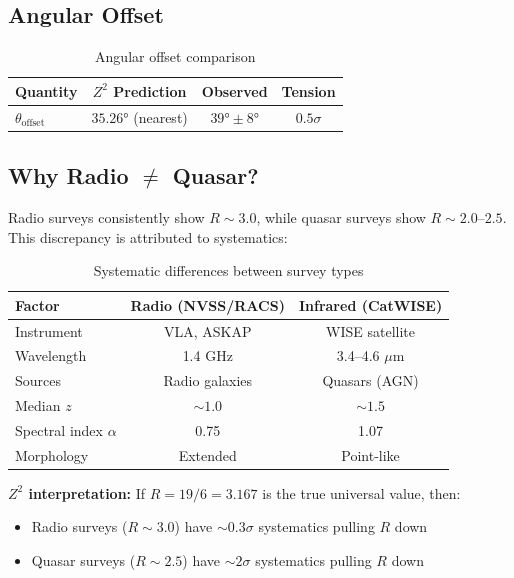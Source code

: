 \documentclass[12pt,a4paper]{article}
\begin{document}
\subsection{Angular Offset}

\begin{table}[H]
\centering
\caption{Angular offset comparison}
\begin{tabular}{lccc}
\toprule
Quantity & $Z^2$ Prediction & Observed & Tension \\
\midrule
$\theta_{\text{offset}}$ & $35.26°$ (nearest) & $39° \pm 8°$ & $0.5\sigma$ \\
\bottomrule
\end{tabular}
\end{table}

\subsection{Why Radio $\neq$ Quasar?}

Radio surveys consistently show $R \sim 3.0$, while quasar surveys show $R \sim 2.0$--$2.5$. This discrepancy is attributed to systematics:

\begin{table}[H]
\centering
\caption{Systematic differences between survey types}
\begin{tabular}{lcc}
\toprule
Factor & Radio (NVSS/RACS) & Infrared (CatWISE) \\
\midrule
Instrument & VLA, ASKAP & WISE satellite \\
Wavelength & 1.4 GHz & 3.4--4.6 $\mu$m \\
Sources & Radio galaxies & Quasars (AGN) \\
Median $z$ & $\sim 1.0$ & $\sim 1.5$ \\
Spectral index $\alpha$ & 0.75 & 1.07 \\
Morphology & Extended & Point-like \\
\bottomrule
\end{tabular}
\end{table}

\textbf{$Z^2$ interpretation:} If $R = 19/6 = 3.167$ is the true universal value, then:
\begin{itemize}
    \item Radio surveys ($R \sim 3.0$) have $\sim 0.3\sigma$ systematics pulling $R$ down
    \item Quasar surveys ($R \sim 2.5$) have $\sim 2\sigma$ systematics pulling $R$ down
\end{itemize}
\end{document}
